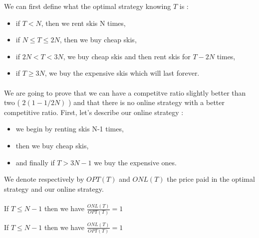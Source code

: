 We can first define what the optimal strategy knowing $T$ is :
\begin{itemize}
	\item if $T<N$, then we rent skis N times,
	\item if $N\leqslant T \leqslant 2N$, then we buy cheap skis,
	\item if $2N<T<3N$, we buy cheap skis and then rent skis for $T-2N$ times,
	\item if $T\geqslant 3N$, we buy the expensive skis which will last forever.
\end{itemize}

\paragraph{}
We are going to prove that we can have a competitve ratio slightly better than two ( $2(1-1/2N)$ ) and that there is no online strategy with a better competitive ratio.
First, let's describe our online strategy : 
\begin{itemize}
	\item we begin by renting skis N-1 times,
	\item then we buy cheap skis,
	\item and finally if $T>3N-1$ we buy the expensive ones.
\end{itemize}


We denote respectively by $OPT(T)$ and $ONL(T)$ the price paid in the optimal strategy and our online strategy.

\paragraph{}
If $T \leqslant N-1$ then we have $\frac{ONL(T)}{OPT(T)} = 1$

If $T \leqslant N-1$ then we have $\frac{ONL(T)}{OPT(T)} = 1$